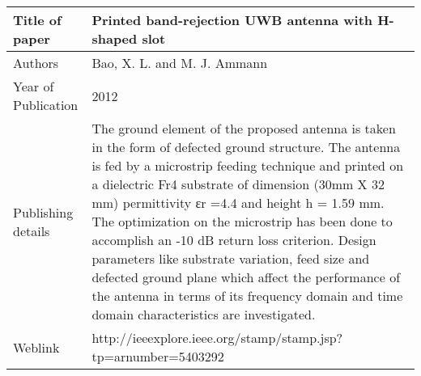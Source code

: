 \documentclass{article}
\begin{document}
\begin{table}
  \centering
	\begin{tabular}{ |l|p{11cm}| }
			\hline
		     Title of paper &  Printed band-rejection UWB antenna with H-shaped slot \\
		     \hline
			 Authors & Bao, X. L. and M. J. Ammann \\
			\hline
			 Year of Publication & 2012 \\
			\hline
			 Publishing details & The ground element of the proposed antenna is taken in the form of defected ground structure. The antenna is fed by a microstrip feeding technique and printed on a dielectric Fr4 substrate of dimension (30mm X 32 mm) permittivity εr =4.4 and height h = 1.59 mm. The optimization on the microstrip has been done to accomplish an -10 dB return loss criterion. Design parameters like substrate variation, feed size and defected ground plane which affect the performance of the antenna in terms of its frequency domain and time domain characteristics are investigated.\\
			\hline
			 Weblink & http://ieeexplore.ieee.org/stamp/stamp.jsp?tp=arnumber=5403292 \\
			 \hline			 
	\end{tabular}		

\end{table}
\end{document}
